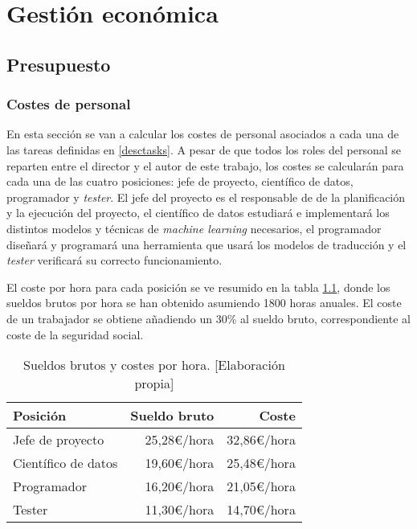 \chapter{Gestión económica}\label{budget}
\section{Presupuesto}
\subsection{Costes de personal}
En esta sección se van a calcular los costes de personal asociados a cada una de las tareas
definidas en \ref{desctasks}. A pesar de que todos los roles del personal se reparten entre
el director y el autor de este trabajo, los costes se calcularán para cada una de las cuatro
posiciones: jefe de proyecto, científico de datos, programador y \textit{tester}.
El jefe del proyecto es el responsable de de la planificación y la ejecución del proyecto,
el científico de datos estudiará e implementará los distintos modelos y técnicas de
\textit{machine learning} necesarios, el programador diseñará y programará una herramienta
que usará los modelos de traducción y el \textit{tester} verificará su correcto funcionamiento.

El coste por hora para cada posición se ve resumido en la tabla \ref{costtable}, donde
los sueldos brutos por hora se han obtenido asumiendo 1800 horas anuales. El coste de un
trabajador se obtiene añadiendo un 30\% al sueldo bruto, correspondiente al coste
de la seguridad social. 

\begin{table}[ht]
\begin{center}
    
    \begin{tabular}{ l r r }
     Posición & Sueldo bruto & Coste \\
     \hline
     Jefe de proyecto & 25,28\euro/hora \cite{Projectmanagercost} & 32,86\euro/hora \\
     Científico de datos & 19,60\euro/hora \cite{Datascientistcost} & 25,48\euro/hora \\
     Programador & 16,20\euro/hora \cite{Programmercost} & 21,05\euro/hora \\
     Tester & 11,30\euro/hora \cite{Testercost} & 14,70\euro/hora \\
    \end{tabular}
    \caption{Sueldos brutos y costes por hora. [Elaboración propia]}\label{costtable}
    
\end{center}
\end{table}

